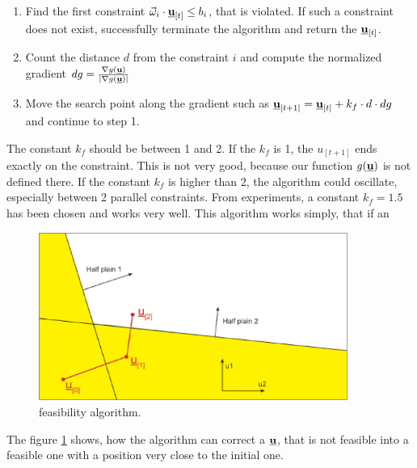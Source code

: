 \documentclass[a4paper,11pt,titlepage]{article}
\newcommand{\uvec}{\textbf{\underline{u}}}
\newcommand{\macg}{g(\uvec)}
\newcommand{\macoi}{\vec{\omega}_i}
\begin{document}
\begin{enumerate}
\item Find the first constraint $\macoi \cdot \uvec_{[t]} \leq b_i$, that is violated. If such a constraint does not exist, successfully terminate the algorithm and return the $\uvec_{[t]}$.

\item Count the distance $d$ from the constraint $i$ and compute the normalized gradient $dg = \frac{\nabla \macg}{|\nabla \macg|}$

\item Move the search point along the gradient such as $\uvec_{[t+1]} = \uvec_{[t]} + k_f \cdot d \cdot dg$ and continue to step 1.
\end{enumerate}

The constant $k_f$ should be between 1 and 2. If the $k_f$ is 1, the $u_{[t+1]}$ ends exactly on the constraint. This is not very good, because our function $\macg$ is not defined there. If the constant $k_f$ is higher than 2, the algorithm could oscillate, especially between 2 parallel constraints. From experiments, a constant $k_f = 1.5$ has been chosen and works very well. This algorithm works simply, that if an 

\begin{figure}[!ht]
\includegraphics[width=0.9\textwidth]{fig/feasibility_paint.eps}
\caption{feasibility algorithm.}
\label{fig:feasibility_algorithm}
\end{figure}


The figure \ref{fig:feasibility_algorithm} shows, how the algorithm can correct a $\uvec$, that is not feasible into a feasible one with a position very close to the initial one. 
\end{document}
